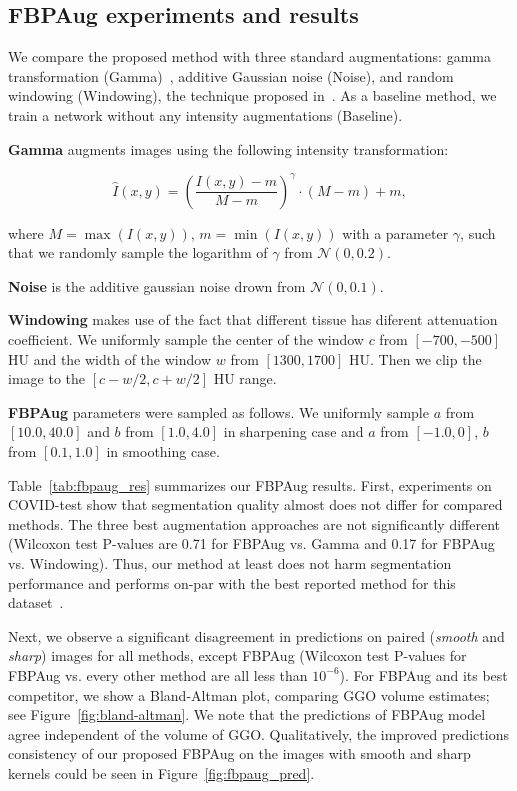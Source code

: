 

\subsection{FBPAug experiments and results}

We compare the proposed method with three standard augmentations: gamma transformation (Gamma)~\cite{tureckova2020improving}, additive Gaussian noise (Noise), and random windowing (Windowing), the technique proposed in~\cite{kloenne2020domain}. As a baseline method, we train a network without any intensity augmentations (Baseline).

\textbf{Gamma} augments images using the following intensity transformation:

\[
	\hat{I}(x, y) = \left(\frac{I(x, y) - m}{M - m}\right)^\gamma \cdot(M - m) + m,
\]

\noindent
where $M = \max(I(x, y))$, $m=\min(I(x, y))$ with a parameter $\gamma$, such that we randomly sample the logarithm of $\gamma$ from $\mathcal{N}(0, 0.2)$. 

\textbf{Noise} is the additive gaussian noise drown from $\mathcal{N}(0, 0.1)$. 

\textbf{Windowing}  makes use of the fact that different tissue has diferent attenuation coefficient. We uniformly sample the center of the window $c$ from $[-700, -500]$ HU  and the width of the window $w$ from $[1300, 1700]$ HU. Then we clip the image to the $[c - w/2, c + w/2]$ HU range.

\textbf{FBPAug} parameters were sampled as follows. We uniformly sample $a$ from $[10.0, 40.0]$ and  $b$ from $[1.0, 4.0]$ in sharpening case and $a$ from $[-1.0, 0]$, $b$ from $[0.1, 1.0]$ in smoothing case.

Table~\ref{tab:fbpaug_res} summarizes our FBPAug results. First, experiments on COVID-test show that segmentation quality almost does not differ for compared methods. The three best augmentation approaches are not significantly different (Wilcoxon test P-values are 0.71 for FBPAug vs. Gamma and 0.17 for FBPAug vs. Windowing). Thus, our method at least does not harm segmentation performance and performs on-par with the best reported method for this dataset~\cite{goncharov2021ct}.



Next, we observe a significant disagreement in predictions on paired (\textit{smooth} and \textit{sharp}) images for all methods, except FBPAug (Wilcoxon test P-values for FBPAug vs. every other method are all less than $10^{-6}$). For FBPAug and its best competitor, we show a Bland-Altman plot, comparing GGO volume estimates; see Figure~\ref{fig:bland-altman}. We note that the predictions of FBPAug model agree independent of the volume of GGO. Qualitatively, the improved predictions consistency of our proposed FBPAug on the images with smooth and sharp kernels could be seen in Figure~\ref{fig:fbpaug_pred}.

